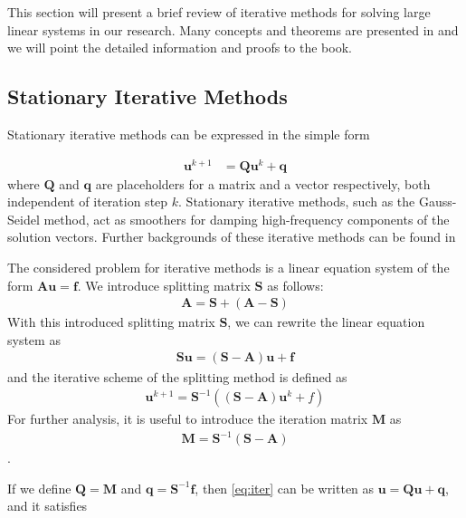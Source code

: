 This section will present a brief review of iterative methods for solving large linear systems in our research. Many concepts and theorems are presented in \cite{doi:10.1137/1.9780898718003} and we will point the detailed information and proofs to the book.
\subsection{Stationary Iterative Methods}
\label{sec:iterative-methods}
Stationary iterative methods can be expressed in the simple form

\begin{align}
    \boldsymbol{u}^{k+1} &= \boldsymbol{Q} \boldsymbol{u}^k + \boldsymbol{q}
    \label{iter:stationary}
\end{align}
where $\boldsymbol{Q}$ and $\boldsymbol{q}$ are placeholders for a matrix and a vector respectively, both independent of iteration step $k$. Stationary iterative methods, such as the Gauss-Seidel method, act as smoothers for damping high-frequency components of the solution vectors. Further backgrounds of these iterative methods can be found in \cite{doi:10.1137/1.9780898718003}

The considered problem for iterative methods is a linear equation system of the form $\boldsymbol{A} \boldsymbol{u} = \boldsymbol{f}$. We introduce splitting matrix $\boldsymbol{S}$ as follows:
\begin{align}
    \boldsymbol{A} = \boldsymbol{S} + (\boldsymbol{A} - \boldsymbol{S})
\end{align}
With this introduced splitting matrix $\boldsymbol{S}$, we can rewrite the linear equation system as
\begin{align}
    \boldsymbol{S}\boldsymbol{u} = (\boldsymbol{S} - \boldsymbol{A}) \boldsymbol{u} + \boldsymbol{f}
\end{align}
and the iterative scheme of the splitting method is defined as 
\begin{align}
    \boldsymbol{u}^{k+1} = \boldsymbol{S}^{-1}((\boldsymbol{S} - \boldsymbol{A}) \boldsymbol{u}^k + f)
    \label{eq:iter}
\end{align}
For further analysis, it is useful to introduce the iteration matrix $\boldsymbol{M}$ as
\begin{align}
    \boldsymbol{M} = \boldsymbol{S}^{-1}(\boldsymbol{S} - \boldsymbol{A})
\end{align}.

If we define $\boldsymbol{Q} = \boldsymbol{M}$ and $\boldsymbol{q} = \boldsymbol{S}^{-1}\boldsymbol{f}$, then \autoref{eq:iter} can be written as $\boldsymbol{u} = \boldsymbol{Q}\boldsymbol{u} + \boldsymbol{q}$, and it satisfies

